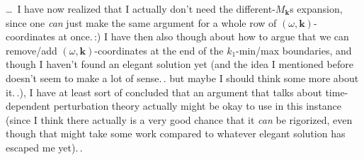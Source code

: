 \documentclass{report}
\begin{document}
\ldots\ I have now realized that I actually don't need the different-$M_{\boldsymbol{k}}$s expansion, since one \emph{can} just make the same argument for a whole row of $(\omega, \boldsymbol{k})$-coordinates at once.\,:) I have then also though about how to argue that we can remove/add $(\omega, \boldsymbol{k})$-coordinates at the end of the $k_1$-min/max boundaries, and though I haven't found an elegant solution yet (and the idea I mentioned before doesn't seem to make a lot of sense.\,. but maybe I should think some more about it.\,.), I have at least sort of concluded that an argument that talks about time-dependent perturbation theory actually might be okay to use in this instance (since I think there actually is a very good chance that it \emph{can} be rigorized, even though that might take some work compared to whatever elegant solution has escaped me yet).\,. %
\end{document}
